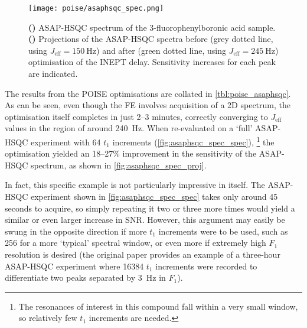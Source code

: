 \begin{figure}[htb]
    \centering
    \texttt{[image: poise/asaphsqc\_spec.png]}%
    {\label{fig:asaphsqc_spec_spec}}%
    {\label{fig:asaphsqc_spec_proj}}%
    \caption[Projections of ASAP-HSQC spectra before and after optimisation]{
        \textbf{()} ASAP-HSQC spectrum of the 3-fluorophenylboronic acid sample.
        \textbf{()} Projections of the ASAP-HSQC spectra before (grey dotted line, using $J_\text{eff} = \qty{150}{\Hz}$) and after (green dotted line, using $J_\text{eff} = \qty{245}{\Hz}$) optimisation of the INEPT delay.
        Sensitivity increases for each peak are indicated.
    }
    \label{fig:asaphsqc_spec}
\end{figure}

The results from the POISE optimisations are collated in \cref{tbl:poise_asaphsqc}.
As can be seen, even though the FE involves acquisition of a 2D spectrum, the optimisation itself completes in just 2--3 minutes, correctly converging to $J_\text{eff}$ values in the region of around \qty{240}{\Hz}.
When re-evaluated on a `full' ASAP-HSQC experiment with 64 $t_1$ increments (\cref{fig:asaphsqc_spec_spec}),%
\footnote{The \carbon{} resonances of interest in this compound fall within a very small window, so relatively few $t_1$ increments are needed.}
the optimisation yielded an 18--27\% improvement in the sensitivity of the ASAP-HSQC spectrum, as shown in \cref{fig:asaphsqc_spec_proj}.

In fact, this specific example is not particularly impressive in itself.
The ASAP-HSQC experiment shown in \cref{fig:asaphsqc_spec_spec} takes only around 45 seconds to acquire, so simply repeating it two or three more times would yield a similar or even larger increase in SNR.
However, this argument may easily be swung in the opposite direction if more $t_1$ increments were to be used, such as 256 for a more `typical' \carbon{} spectral window, or even more if extremely high $F_1$ resolution is desired (the original paper\autocite{SchulzeSunninghausen2014JACS} provides an example of a three-hour ASAP-HSQC experiment where 16384 $t_1$ increments were recorded to differentiate two peaks separated by \qty{3}{\Hz} in $F_1$).
